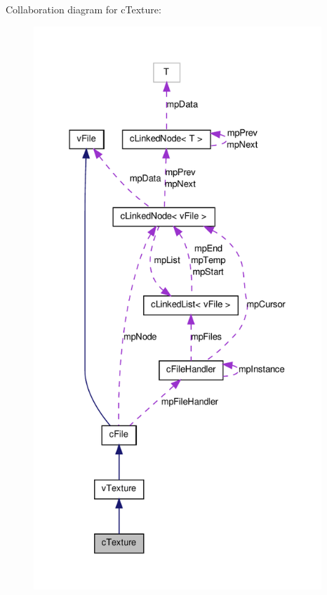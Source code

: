 Collaboration diagram for cTexture:
\nopagebreak
\begin{figure}[H]
\begin{center}
\leavevmode
\includegraphics[height=600pt]{classc_texture__coll__graph}
\end{center}
\end{figure}

